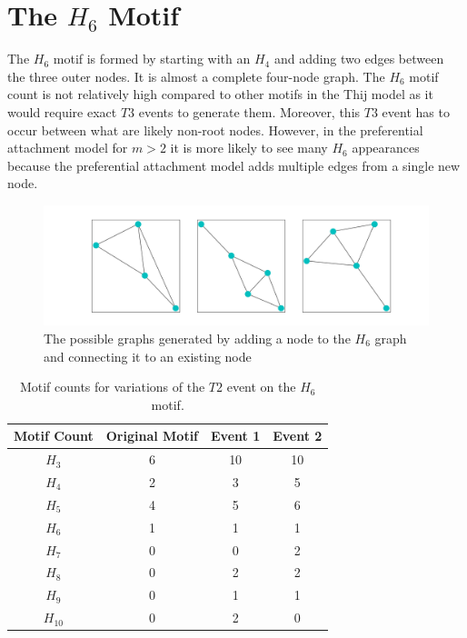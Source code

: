 \section{The \texorpdfstring{$H_{6}$}{H6} Motif}
The $H_{6}$ motif is formed by starting with an $H_{4}$ and adding two edges between the three outer nodes. It is 
almost a complete four-node graph. 
The $H_{6}$ motif count is not relatively high compared to other motifs in the Thij
model as it would require exact $T3$ events to generate them. Moreover, this
$T3$ event has to occur between what are likely non-root nodes. However, in the preferential attachment model for $m>2$
it is more likely to see many $H_{6}$ appearances because the preferential attachment model adds multiple edges from a single new node.

\begin{figure}[!ht]
    \includegraphics[width=14cm]{Images/H6_evolution.png}
    \centering
    \caption{The possible graphs generated by adding a node to the $H_{6}$ graph 
    and connecting it to an existing node}
\end{figure}
\FloatBarrier

\begin{table}
    \centering
    \begin{tabular}{||c c c c||} 
    \hline
    Motif Count & Original Motif & Event 1 & Event 2\\ [0.5ex] 
    \hline\hline
    $H_{3}$ & 6 & 10 & 10\\ 
    \hline
    $H_{4}$ & 2 & 3 & 5\\
    \hline
    $H_{5}$ & 4 & 5 & 6\\
    \hline
    $H_{6}$ & 1 & 1 & 1\\
    \hline
    $H_{7}$ & 0 & 0 & 2\\
    \hline
    $H_{8}$ & 0 & 2 & 2\\
    \hline
    $H_{9}$ & 0 & 1 & 1\\
    \hline
    $H_{10}$ & 0 & 2 & 0\\
    \hline
   \end{tabular}
   \caption{Motif counts for variations of the $T2$ event on the $H_{6}$ motif.}
    \label{table:4}
\end{table}

